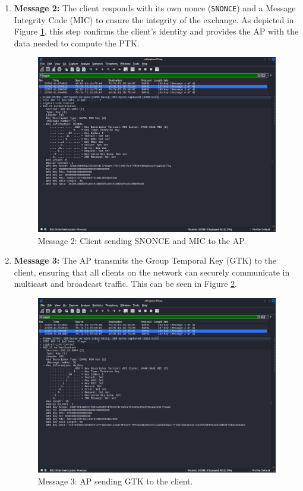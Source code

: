 \begin{enumerate}
\begin{enumerate}
    \item \textbf{Message 2:} The client responds with its own nonce (\texttt{SNONCE}) and a Message Integrity Code (MIC) to ensure the integrity of the exchange. As depicted in Figure \ref{fig:msg2}, this step confirms the client’s identity and provides the AP with the data needed to compute the PTK.
    \begin{figure}[h!]
        \centering
        \includegraphics[width=0.8\linewidth]{images/msg2.png}
        \caption{Message 2: Client sending SNONCE and MIC to the AP.}
        \label{fig:msg2}
    \end{figure}

    \item \textbf{Message 3:} The AP transmits the Group Temporal Key (GTK) to the client, ensuring that all clients on the network can securely communicate in multicast and broadcast traffic. This can be seen in Figure \ref{fig:msg3}.
    \begin{figure}[h!]
        \centering
        \includegraphics[width=0.8\linewidth]{images/msg3.png}
        \caption{Message 3: AP sending GTK to the client.}
        \label{fig:msg3}
    \end{figure}


\end{enumerate}
\end{enumerate}
